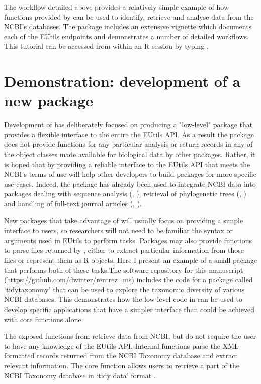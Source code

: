The workflow detailed above provides a relatively simple example of how functions
provided by  can be used to identify, retrieve and analyse data
from the NCBI's databases. The package includes an extensive vignette which
documents each of the EUtils endpoints and demonstrates a number of detailed
workflows. This tutorial can be accessed from within an R session by typing 
.

\section{Demonstration: development of a new package}

Development of  has deliberately focused on producing a "low-level"
package that provides a flexible interface to the entire the EUtils API. As a 
result the package does not provide functions for any particular analysis
or return records in any of the object classes made available for biological
data by other packages. Rather, it is hoped that by providing a reliable interface
to the EUtils API that meets the NCBI's terms of use  will help 
other developers to build packages for more specific use-cases. Indeed, the
package has already been used to integrate NCBI data into packages dealing
with sequence analysis (, \citealt{genbankr}), retrieval of
phylogenetic trees (, \citealt{rotl}) and handling of
full-text journal articles (, \citealt{fulltext}).

New packages that take advantage of  will usually focus on
providing a simple interface to users, so researchers will not need to be
familiar the syntax or arguments used in EUtils to perform tasks. Packages may
also provide functions to parse files returned by , either
to extract particular information from those files or represent them as R 
objects. Here I present an example of a small package that performs both of
these tasks.The software repository for this manuscript
(\url{https://github.com/dwinter/rentrez_ms}) includes the code for a package 
called `tidytaxonomy' that can be used to explore the taxonomic
diversity of various NCBI databases. This demonstrates how the 
low-level code in  can be used to develop specific applications 
that have a simpler interface than could be achieved with core 
 functions alone.

The exposed functions from  retrieve data from NCBI, but do not
require the user to have any knowledge of the EUtils API. Internal functions
parse the XML formatted records returned from the NCBI Taxonomy database and
extract relevant information. The core function  allows 
users to retrieve a part of the NCBI  Taxonomy database in `tidy data' format
\citep{tidy-data}.

